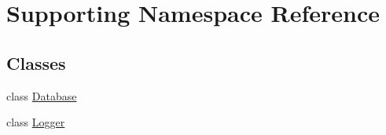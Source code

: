 \hypertarget{namespace_supporting}{}\section{Supporting Namespace Reference}
\label{namespace_supporting}
\subsection*{Classes}
\begin{DoxyCompactItemize}
\item 
class \hyperlink{class_supporting_1_1_database}{Database}
\item 
class \hyperlink{class_supporting_1_1_logger}{Logger}
\end{DoxyCompactItemize}
